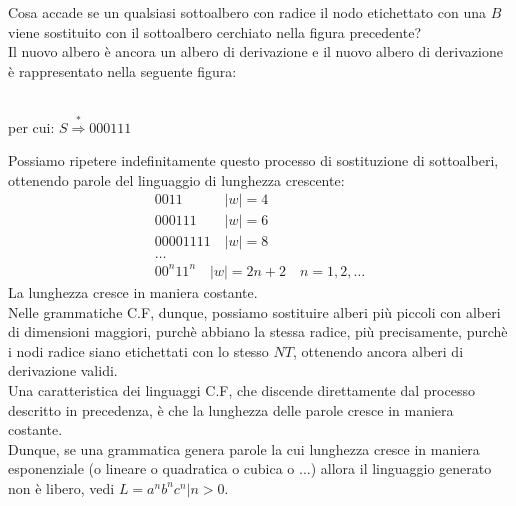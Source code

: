 \documentclass[12pt]{report}
\begin{document}
	Cosa accade se un qualsiasi sottoalbero con radice il nodo etichettato con una $B$ viene sostituito con il sottoalbero cerchiato nella figura precedente? \\
	Il nuovo albero è ancora un albero di derivazione e il nuovo albero di derivazione è rappresentato nella seguente figura:
	\begin{center}
		 \\
		per cui: $S \overset{*}{\Rightarrow} 000111$
	\end{center}
	Possiamo ripetere indefinitamente questo processo di sostituzione di sottoalberi, ottenendo parole del linguaggio di lunghezza crescente:
	\[
	\begin{array}{l}
		0011\phantom{0011} \quad |w|=4 \\
		000111\phantom{01} \quad |w|=6 \\
		00001111 \quad |w|=8 \\
		\dots \\
		00^n11^n \quad |w|=2n+2 \quad n=1,2,\dots
	\end{array}
	\]
	La lunghezza cresce in maniera costante. \\
	Nelle grammatiche C.F, dunque, possiamo sostituire alberi più piccoli con alberi di dimensioni maggiori, purchè abbiano la stessa radice, più precisamente, purchè i nodi radice siano etichettati con lo stesso $NT$, ottenendo ancora alberi di derivazione validi. \\
	Una caratteristica dei linguaggi C.F, che discende direttamente dal processo descritto in precedenza, è che la lunghezza delle parole cresce in maniera costante. \\
	Dunque, se una grammatica genera parole la cui lunghezza cresce in maniera esponenziale (o lineare o quadratica o cubica o ...) allora il linguaggio generato non è libero, vedi $L = {a^nb^nc^n | n > 0}$. \\
\end{document}
